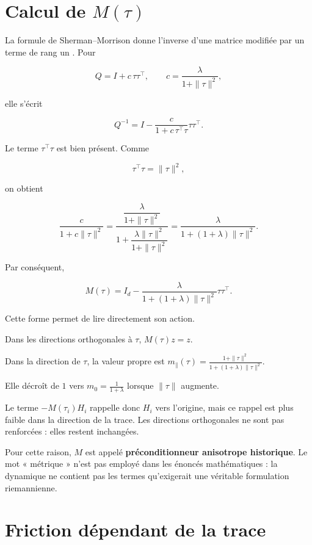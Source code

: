 \section{Calcul de \texorpdfstring{\(M(\tau)\)}{M(tau)}}\label{t1-calcul-de-mtau}

La formule de Sherman--Morrison donne l'inverse d'une matrice modifiée
par un terme de rang un \cite{sherman1950adjustment}. Pour

\[
Q=I+c\,\tau\tau^\top,
\qquad
c=\frac{\lambda}{1+\|\tau\|^2},
\]

elle s'écrit

\[
Q^{-1}
=
I-
\frac{c}{1+c\,\tau^\top\tau}
\tau\tau^\top.
\]

Le terme \(\tau^\top\tau\) est bien présent. Comme

\[
\tau^\top\tau=\|\tau\|^2,
\]

on obtient

\[
\frac{c}{1+c\|\tau\|^2}
=
\frac{
\dfrac{\lambda}{1+\|\tau\|^2}
}{
1+
\dfrac{\lambda\|\tau\|^2}{1+\|\tau\|^2}
}
=
\frac{\lambda}
{1+(1+\lambda)\|\tau\|^2}.
\]

Par conséquent,

\[
\boxed{
M(\tau)
=
I_d
-
\frac{\lambda}
{1+(1+\lambda)\|\tau\|^2}
\tau\tau^\top
}.
\]

Cette forme permet de lire directement son action.

Dans les directions orthogonales à \(\tau\), \(M(\tau)z=z\).

Dans la direction de \(\tau\), la valeur propre est
\(
m_\parallel(\tau)
=
\frac{1+\|\tau\|^2}
{1+(1+\lambda)\|\tau\|^2}.
\)

Elle décroît de \(1\) vers \(m_0=\frac{1}{1+\lambda}\) lorsque \(\|\tau\|\) augmente.

Le terme \(-M(\tau_i)H_i\) rappelle donc \(H_i\) vers l'origine, mais ce rappel est plus faible dans la direction de la trace. Les directions orthogonales ne sont pas renforcées : elles restent inchangées.

Pour cette raison, \(M\) est appelé \textbf{préconditionneur anisotrope historique}. Le mot « métrique » n'est pas employé dans les énoncés mathématiques : la dynamique ne contient pas les termes qu'exigerait une véritable formulation riemannienne.

\section{Friction dépendant de la trace}\label{t1-friction-dependant-de-la-trace}

